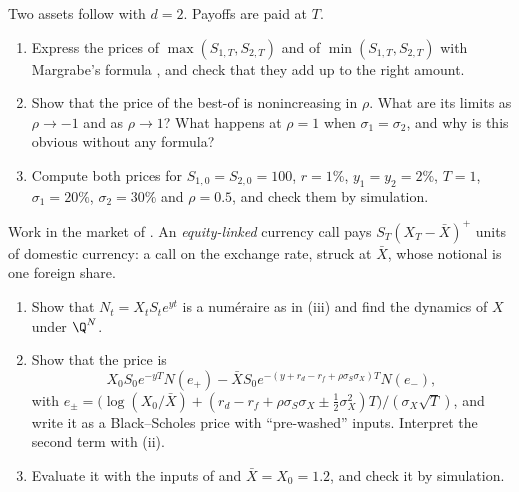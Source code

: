 \begin{exercise}\label{ex:ma-max}
\medium Two assets follow  with $d=2$. Payoffs are paid at $T$.
\begin{enumerate}[label=(\alph*)]
  \item Express the prices of $\max(S_{1,T},S_{2,T})$ and of $\min(S_{1,T},S_{2,T})$ with Margrabe's
    formula , and check that they add up to the right amount.
  \item Show that the price of the best-of is nonincreasing in $\rho$. What are its limits as
    $\rho\to-1$ and as $\rho\to1$? What happens at $\rho=1$ when $\sigma_1=\sigma_2$, and why is this
    obvious without any formula?
  \item Compute both prices for $S_{1,0}=S_{2,0}=100$, $r=1\%$, $y_1=y_2=2\%$, $T=1$, $\sigma_1=20\%$,
    $\sigma_2=30\%$ and $\rho=0.5$, and check them by simulation.
\end{enumerate}
\end{exercise}

\begin{exercise}\label{ex:ma-elf}
\medium Work in the market of . An \emph{equity-linked} currency call pays
$S_T(X_T-\bar X)^+$ units of domestic currency: a call on the exchange rate, struck at $\bar X$, whose
notional is one foreign share.
\begin{enumerate}[label=(\alph*)]
  \item Show that $N_t=X_tS_te^{yt}$ is a num\'eraire as in (iii) and find
    the dynamics of $X$ under $\Q^N$.
  \item Show that the price is
    \[
      X_0S_0e^{-yT}N(e_+)-\bar XS_0e^{-(y+r_d-r_f+\rho\sigma_S\sigma_X)T}N(e_-),
    \]
    with $e_\pm=\big(\log(X_0/\bar X)+(r_d-r_f+\rho\sigma_S\sigma_X\pm\frac12\sigma_X^2)T\big)/(\sigma_X\sqrt T)$,
    and write it as a Black--Scholes price with ``pre-washed'' inputs. Interpret the second term
    with (ii).
  \item Evaluate it with the inputs of  and $\bar X=X_0=1.2$, and check it by
    simulation.
\end{enumerate}
\end{exercise}

